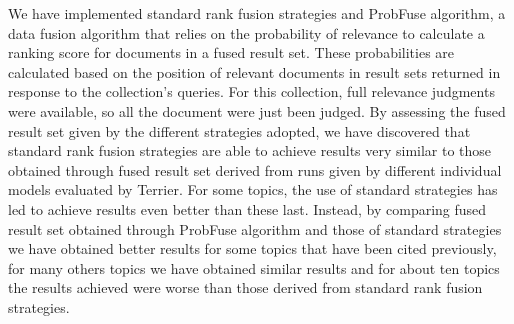 \documentclass[12pt,journal]{IEEEtran}
\begin{document}
We have implemented standard rank fusion strategies and ProbFuse algorithm, a data fusion algorithm that relies on the probability of relevance to calculate a ranking score for documents in a fused result set.
These probabilities are calculated based on the position of relevant documents in result sets returned in response to the collection’s queries. For this collection, full relevance judgments were available, so all the document were just been judged. 
By assessing the fused result set given by the different strategies adopted, we have discovered that standard rank fusion strategies are able to achieve results very similar to those obtained through fused result set derived from runs given by different individual models evaluated by Terrier. For some topics, the use of standard strategies has led to achieve results even better than these last. Instead, by comparing fused result set obtained through ProbFuse algorithm and those of standard strategies we have obtained better results for some topics that have been cited previously, for many others topics we have obtained similar results and for about ten topics the results achieved were worse than those derived from standard rank fusion strategies. \\
\end{document}
